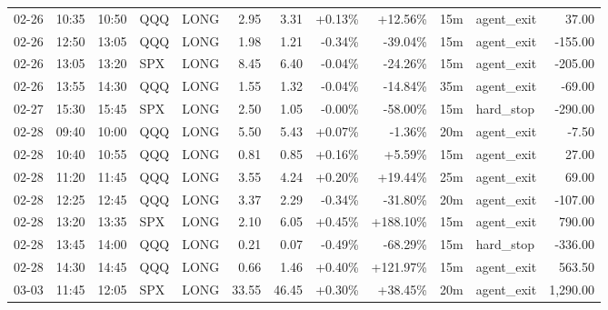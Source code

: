 \documentclass[11pt,a4paper]{article}
\begin{document}
\begin{center}
\begin{longtable}{>{\color{txtmain}}l l l l l r r r r r >{\color{txtmain}}l r}
02-26 & 10:35 & 10:50 & QQQ & LONG & 2.95 & 3.31 & \textcolor{wingreen}{+0.13\%} & \textcolor{wingreen}{+12.56\%} & 15m & agent\_exit & \textcolor{wingreen}{37.00} \\
02-26 & 12:50 & 13:05 & QQQ & LONG & 1.98 & 1.21 & \textcolor{lossred}{-0.34\%} & \textcolor{lossred}{-39.04\%} & 15m & agent\_exit & \textcolor{lossred}{-155.00} \\
02-26 & 13:05 & 13:20 & SPX & LONG & 8.45 & 6.40 & \textcolor{lossred}{-0.04\%} & \textcolor{lossred}{-24.26\%} & 15m & agent\_exit & \textcolor{lossred}{-205.00} \\
02-26 & 13:55 & 14:30 & QQQ & LONG & 1.55 & 1.32 & \textcolor{lossred}{-0.04\%} & \textcolor{lossred}{-14.84\%} & 35m & agent\_exit & \textcolor{lossred}{-69.00} \\
02-27 & 15:30 & 15:45 & SPX & LONG & 2.50 & 1.05 & \textcolor{lossred}{-0.00\%} & \textcolor{lossred}{-58.00\%} & 15m & hard\_stop & \textcolor{lossred}{-290.00} \\
02-28 & 09:40 & 10:00 & QQQ & LONG & 5.50 & 5.43 & \textcolor{wingreen}{+0.07\%} & \textcolor{lossred}{-1.36\%} & 20m & agent\_exit & \textcolor{lossred}{-7.50} \\
02-28 & 10:40 & 10:55 & QQQ & LONG & 0.81 & 0.85 & \textcolor{wingreen}{+0.16\%} & \textcolor{wingreen}{+5.59\%} & 15m & agent\_exit & \textcolor{wingreen}{27.00} \\
02-28 & 11:20 & 11:45 & QQQ & LONG & 3.55 & 4.24 & \textcolor{wingreen}{+0.20\%} & \textcolor{wingreen}{+19.44\%} & 25m & agent\_exit & \textcolor{wingreen}{69.00} \\
02-28 & 12:25 & 12:45 & QQQ & LONG & 3.37 & 2.29 & \textcolor{lossred}{-0.34\%} & \textcolor{lossred}{-31.80\%} & 20m & agent\_exit & \textcolor{lossred}{-107.00} \\
02-28 & 13:20 & 13:35 & SPX & LONG & 2.10 & 6.05 & \textcolor{wingreen}{+0.45\%} & \textcolor{wingreen}{+188.10\%} & 15m & agent\_exit & \textcolor{wingreen}{790.00} \\
02-28 & 13:45 & 14:00 & QQQ & LONG & 0.21 & 0.07 & \textcolor{lossred}{-0.49\%} & \textcolor{lossred}{-68.29\%} & 15m & hard\_stop & \textcolor{lossred}{-336.00} \\
02-28 & 14:30 & 14:45 & QQQ & LONG & 0.66 & 1.46 & \textcolor{wingreen}{+0.40\%} & \textcolor{wingreen}{+121.97\%} & 15m & agent\_exit & \textcolor{wingreen}{563.50} \\
03-03 & 11:45 & 12:05 & SPX & LONG & 33.55 & 46.45 & \textcolor{wingreen}{+0.30\%} & \textcolor{wingreen}{+38.45\%} & 20m & agent\_exit & \textcolor{wingreen}{1,290.00} \\

\end{longtable}
\end{center}
\end{document}
